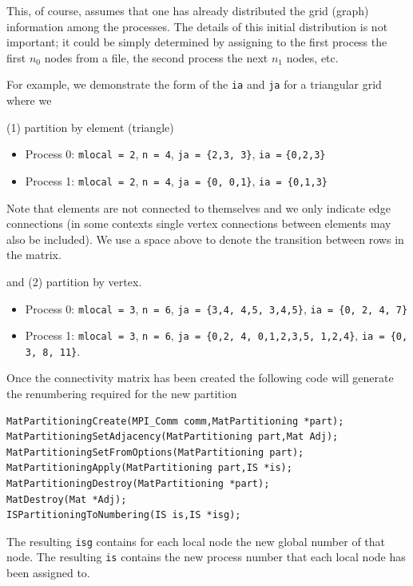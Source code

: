 This, of course, assumes that one has already distributed the grid (graph) information
among the processes. The details of this initial distribution is not important; it
could be simply determined by assigning to the first process the first $n_0$ nodes
from a file, the second process the next $ n_1$ nodes, etc.

For example, we demonstrate the form of the \lstinline{ia} and \lstinline{ja} for a triangular
grid where we

(1) partition by element (triangle)
\begin{itemize}
  \item Process 0: \lstinline{mlocal = 2}, \lstinline{n = 4}, \lstinline{ja = }\texttt{\{2,3, 3\}}, \lstinline{ia =} \texttt{\{0,2,3\}}
  \item Process 1: \lstinline{mlocal = 2}, \lstinline{n = 4}, \lstinline{ja = }\texttt{\{0,  0,1\}}, \lstinline{ia = }\texttt{\{0,1,3\}}
\end{itemize}
Note that elements are not connected to themselves and we only indicate edge connections
(in some contexts single vertex connections between elements may also be included). We use a
space above to denote the transition between rows in the matrix.

and (2) partition by vertex.
\begin{itemize}
  \item Process 0: \lstinline{mlocal = 3}, \lstinline{n = 6}, \lstinline{ja = }\texttt{\{3,4,  4,5, 3,4,5\}}, \lstinline{ia = }\texttt{\{0, 2, 4, 7\}}
  \item Process 1: \lstinline{mlocal = 3}, \lstinline{n = 6}, \lstinline{ja = }\texttt{\{0,2, 4, 0,1,2,3,5, 1,2,4\}}, \lstinline{ia = }\texttt{\{0, 3, 8, 11\}}.
\end{itemize}

Once the connectivity matrix has been created the following code will
generate the renumbering required for the new partition
\begin{lstlisting}
MatPartitioningCreate(MPI_Comm comm,MatPartitioning *part);
MatPartitioningSetAdjacency(MatPartitioning part,Mat Adj);
MatPartitioningSetFromOptions(MatPartitioning part);
MatPartitioningApply(MatPartitioning part,IS *is);
MatPartitioningDestroy(MatPartitioning *part);
MatDestroy(Mat *Adj);
ISPartitioningToNumbering(IS is,IS *isg);
\end{lstlisting}
The resulting \lstinline{isg} contains for each local node the new global
number of that node. The resulting \lstinline{is} contains the new process number
that each local node has been assigned to.

